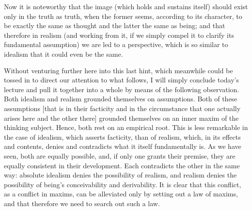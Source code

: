 Now it is noteworthy that the image
(which holds and sustains itself)
should exist only in the truth as truth,
when the former seems, according to its character,
to be exactly the same as thought
and the latter the same as being;
and that therefore in realism
(and working from it, if we simply compel it
to clarify its fundamental assumption)
we are led to a perspective,
which is so similar to idealism
that it could even be the same.

Without venturing further here into this last hint,
which meanwhile could be tossed in
to direct our attention to what follows,
I will simply conclude today's lecture
and pull it together into a whole
by means of the following observation.
Both idealism and realism grounded themselves on assumptions.
Both of these assumptions
[that is in their facticity and in the circumstance
that one actually arises here and the other there]
grounded themselves on an inner maxim of the thinking subject.
Hence, both rest on an empirical root.
This is less remarkable in the case of idealism,
which asserts facticity, than of realism,
which, in its effects and contents,
denies and contradicts what it itself fundamentally is.
As we have seen, both are equally possible,
and, if only one grants their premise,
they are equally consistent in their development.
Each contradicts the other in the same way:
absolute idealism denies the possibility of realism,
and realism denies the possibility of
being's conceivability and derivability.
It is clear that this conflict,
as a conflict in maxims, can be alleviated
only by setting out a law of maxims,
and that therefore we need to search out such a law.

